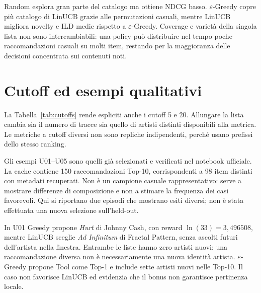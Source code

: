 Random esplora gran parte del catalogo ma ottiene NDCG basso. $\varepsilon$-Greedy copre più catalogo di LinUCB grazie alle permutazioni casuali, mentre LinUCB migliora novelty e ILD medie rispetto a $\varepsilon$-Greedy. Coverage e varietà della singola lista non sono intercambiabili: una policy può distribuire nel tempo poche raccomandazioni casuali su molti item, restando per la maggioranza delle decisioni concentrata sui contenuti noti.

\section{Cutoff ed esempi qualitativi}
La Tabella~\ref{tab:cutoffs} rende espliciti anche i cutoff 5 e 20. Allungare la lista cambia sia il numero di tracce sia quello di artisti distinti disponibili alla metrica. Le metriche a cutoff diversi non sono repliche indipendenti, perché usano prefissi dello stesso ranking.
\begin{table}[htbp]\centering\scriptsize

\caption{Metriche held-out a @5 e @20. TN, AN e ILD conservano le definizioni del Capitolo~\ref{ch:metodo}.}\label{tab:cutoffs}
\end{table}

Gli esempi U01--U05 sono quelli già selezionati e verificati nel notebook ufficiale. La cache contiene 150 raccomandazioni Top-10, corrispondenti a 98 item distinti con metadati recuperati. Non è un campione casuale rappresentativo: serve a mostrare differenze di composizione e non a stimare la frequenza dei casi favorevoli. Qui si riportano due episodi che mostrano esiti diversi; non è stata effettuata una nuova selezione sull'held-out.

\begin{table}[htbp]\centering\small

\caption{U01, 01/03/2009 alle 11:44:06. La colonna Nuovi conta gli artisti distinti nuovi nelle Top-10; la reward riguarda solo la Top-1.}\label{tab:u01}
\end{table}

In U01 Greedy propone \emph{Hurt} di Johnny Cash, con reward $\ln(33)=3{,}496508$, mentre LinUCB sceglie \emph{Ad Infinitum} di Fractal Pattern, senza ascolti futuri dell'artista nella finestra. Entrambe le liste hanno zero artisti nuovi: una raccomandazione diversa non è necessariamente una nuova identità artista. $\varepsilon$-Greedy propone Tool come Top-1 e include sette artisti nuovi nelle Top-10. Il caso non favorisce LinUCB ed evidenzia che il bonus non garantisce pertinenza locale.

